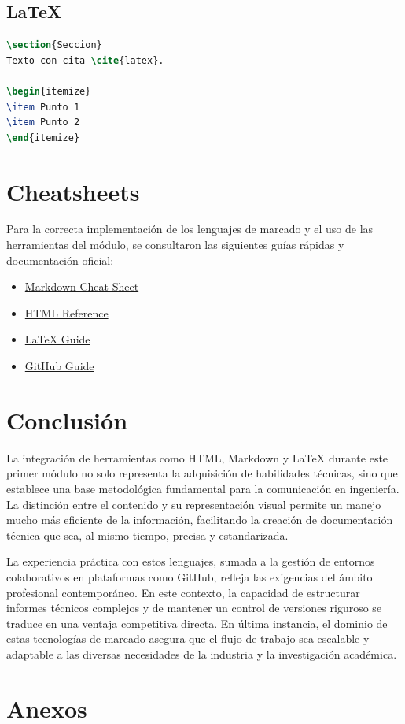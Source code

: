 \documentclass[runningheads]{llncs}
\begin{document}
\subsection{LaTeX}
\begin{lstlisting}[language=TeX, caption=Ejemplo LaTeX]
\section{Seccion}
Texto con cita \cite{latex}.

\begin{itemize}
\item Punto 1
\item Punto 2
\end{itemize}
\end{lstlisting}

\section{Cheatsheets}

Para la correcta implementación de los lenguajes de marcado y el uso de las herramientas del módulo, se consultaron las siguientes guías rápidas y documentación oficial:

\begin{itemize}
\item \href{https://www.markdownguide.org/cheat-sheet/}{Markdown Cheat Sheet} \cite{markdown}
\item \href{https://www.w3schools.com}{HTML Reference} \cite{html}
\item \href{https://www.overleaf.com/learn}{LaTeX Guide} \cite{latex}
\item \href{https://education.github.com}{GitHub Guide} \cite{git}
\end{itemize}

\section{Conclusión}
La integración de herramientas como HTML, Markdown y LaTeX durante este primer módulo no solo representa la adquisición de habilidades técnicas, sino que establece una base metodológica fundamental para la comunicación en ingeniería. La distinción entre el contenido y su representación visual permite un manejo mucho más eficiente de la información, facilitando la creación de documentación técnica que sea, al mismo tiempo, precisa y estandarizada.

La experiencia práctica con estos lenguajes, sumada a la gestión de entornos colaborativos en plataformas como GitHub, refleja las exigencias del ámbito profesional contemporáneo. En este contexto, la capacidad de estructurar informes técnicos complejos y de mantener un control de versiones riguroso se traduce en una ventaja competitiva directa. En última instancia, el dominio de estas tecnologías de marcado asegura que el flujo de trabajo sea escalable y adaptable a las diversas necesidades de la industria y la investigación académica.

\section{Anexos}





\end{document}
